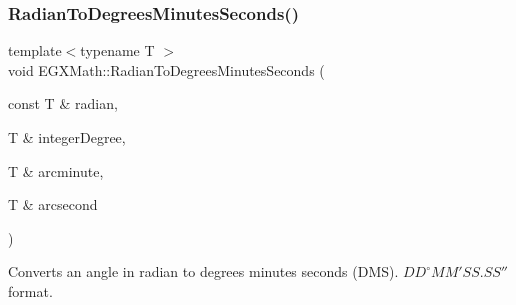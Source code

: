 \subsubsection{\texorpdfstring{Radian\+To\+Degrees\+Minutes\+Seconds()}{RadianToDegreesMinutesSeconds()}}
{\footnotesize\ttfamily template$<$typename T $>$ \\
void E\+G\+X\+Math\+::\+Radian\+To\+Degrees\+Minutes\+Seconds (\begin{DoxyParamCaption}\item[{const T \&}]{radian,  }\item[{T \&}]{integer\+Degree,  }\item[{T \&}]{arcminute,  }\item[{T \&}]{arcsecond }\end{DoxyParamCaption})}



Converts an angle in radian to degrees minutes seconds (D\+MS). ${DD}^{\circ}{MM}'{SS.SS}''$ format. 

